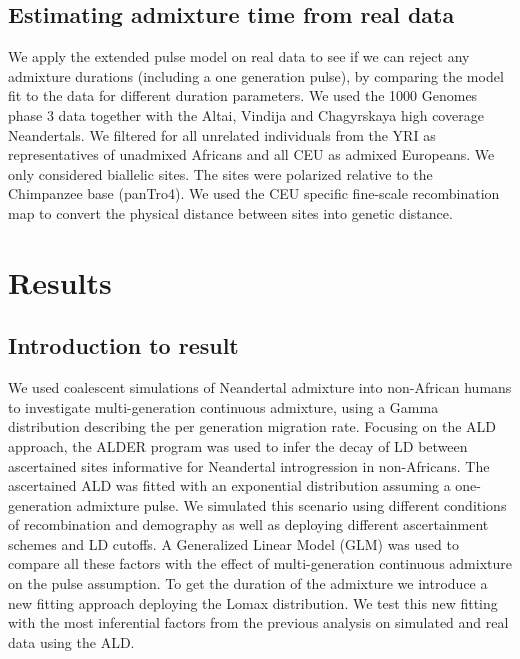 \documentclass[]{article}
\begin{document}
\subsection{Estimating admixture time from real data}\label{Estimating admixture time from real data}

We apply the extended pulse model on real data to see if we can reject any admixture durations (including a one generation pulse), by comparing the model fit to the data for different duration parameters.
We used the 1000 Genomes phase 3 data together with the Altai, Vindija and Chagyrskaya high coverage Neandertals.  We filtered for all unrelated individuals from the YRI as representatives of unadmixed Africans and all CEU as admixed Europeans. We only considered biallelic sites. The sites were polarized relative to the Chimpanzee base (panTro4). We used the CEU specific fine-scale recombination map \citep{spence_inference_2019} to convert the physical distance between sites into genetic distance. 

\section{Results}\label{results}

\subsection{Introduction to result}\label{introduction to result}

We used coalescent simulations of Neandertal admixture into non-African humans to investigate multi-generation continuous admixture, using a Gamma distribution describing the per generation migration rate. Focusing on the ALD approach, the ALDER program was used to infer the decay of LD between ascertained sites informative for Neandertal introgression in non-Africans. The ascertained ALD was fitted with an exponential distribution assuming a one-generation admixture pulse.  We simulated this scenario using different conditions of recombination and demography as well as deploying different ascertainment schemes and LD cutoffs. A Generalized Linear Model (GLM) was used to compare all these factors with the effect of multi-generation continuous admixture on the pulse assumption. To get the duration of the admixture we introduce a new fitting approach deploying the Lomax distribution. We test this new fitting with the most inferential factors from the previous analysis on simulated and real data using the ALD.
\end{document}
